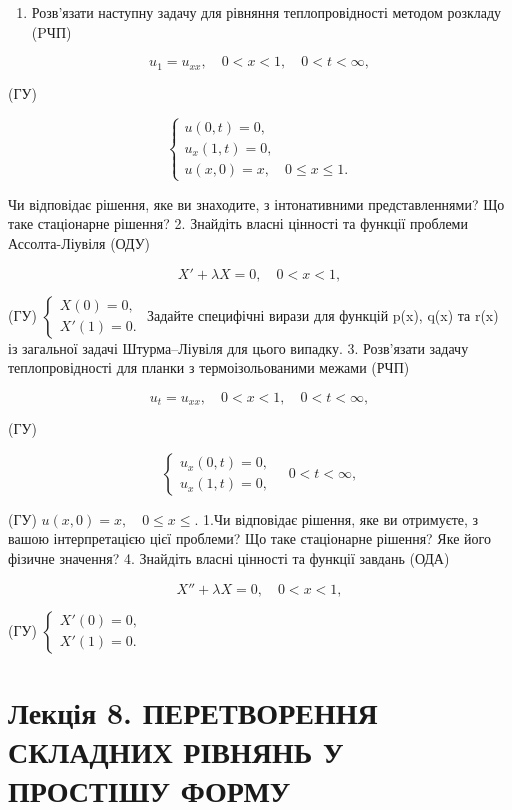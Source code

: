\begin{enumerate}
\def\labelenumi{\arabic{enumi}.}
\tightlist
\item
  Розв'язати наступну задачу для рівняння теплопровідності методом розкладу (PЧП)
\end{enumerate}

\[
u_1 = u_{xx}, \quad 0 < x < 1, \quad 0 < t < \infty,
\]

(ГУ)

\[
\begin{cases} u(0, t) = 0, \\ u_x(1, t) = 0, \\ u(x, 0) = x, \quad 0 \le x \le 1. \end{cases}
\]

Чи відповідає рішення, яке ви знаходите, з інтонативними представленнями? Що таке стаціонарне рішення? 2. Знайдіть власні цінності та функції проблеми Ассолта-Ліувіля (ОДУ)

\[
X' + \lambda X = 0, \quad 0 < x < 1,
\]

(ГУ) \(\begin{cases} X(0) = 0, \\ X'(1) = 0. \end{cases}\) Задайте специфічні вирази для функцій p(x), q(x) та r(x) із загальної задачі Штурма--Ліувіля для цього випадку. 3. Розв'язати задачу теплопровідності для планки з термоізольованими межами (РЧП)

\[
u_t = u_{xx}, \quad 0 < x < 1, \quad 0 < t < \infty,
\]

(ГУ)

\[
\begin{cases} u_x (0, t) = 0, \\ u_x (1, t) = 0, \end{cases} \quad 0 < t < \infty,
\]

(ГУ) \(u(x, 0) = x, \quad 0 \le x \le.\) 1.Чи відповідає рішення, яке ви отримуєте, з вашою інтерпретацією цієї проблеми? Що таке стаціонарне рішення? Яке його фізичне значення? 4. Знайдіть власні цінності та функції завдань (ОДА)

\[
X'' + \lambda X = 0, \quad 0 < x < 1,
\]

(ГУ) \(\begin{cases} X'(0) = 0, \\ X'(1) = 0. \end{cases}\)

\section{Лекція 8. ПЕРЕТВОРЕННЯ СКЛАДНИХ РІВНЯНЬ У ПРОСТІШУ ФОРМУ}\label{ux43bux435ux43aux446ux456ux44f-8.-ux43fux435ux440ux435ux442ux432ux43eux440ux435ux43dux43dux44f-ux441ux43aux43bux430ux434ux43dux438ux445-ux440ux456ux432ux43dux44fux43dux44c-ux443-ux43fux440ux43eux441ux442ux456ux448ux443-ux444ux43eux440ux43cux443}

